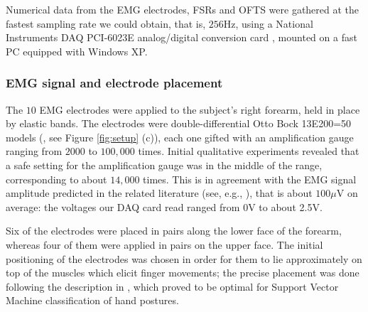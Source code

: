 Numerical data from the EMG electrodes, FSRs and OFTS were gathered at
the fastest sampling rate we could obtain, that is, $256$Hz, using a
National Instruments DAQ PCI-6023E analog/digital conversion card
\cite{nidaq}, mounted on a fast PC equipped with Windows XP.

\subsubsection{EMG signal and electrode placement}
\label{subsubsec:electrodes}

The $10$ EMG electrodes were applied to the subject's right forearm,
held in place by elastic bands. The electrodes were
double-differential Otto Bock 13E200=50 models (\cite{ottobock}, see
Figure \ref{fig:setup} (c)), each one gifted with an amplification
gauge ranging from $2000$ to $100,000$ times. Initial qualitative
experiments revealed that a safe setting for the amplification gauge
was in the middle of the range, corresponding to about $14,000$
times. This is in agreement with the EMG signal amplitude predicted in
the related literature (see, e.g., \cite{deluca}), that is about $100
\mu$V on average: the voltages our DAQ card read ranged from 0V to
about 2.5V.

Six of the electrodes were placed in pairs along the lower face of the
forearm, whereas four of them were applied in pairs on the upper
face. The initial positioning of the electrodes was chosen in order
for them to lie approximately on top of the muscles which elicit
finger movements; the precise placement was done following the
description in \cite{smagt}, which proved to be optimal for Support
Vector Machine classification of hand postures.

